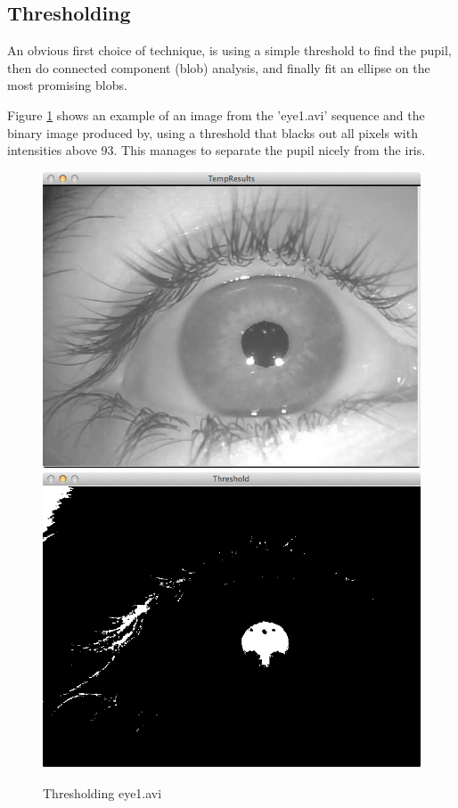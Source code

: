 \documentclass[a4paper,11pt]{article}
\begin{document}
\subsection{Thresholding}
An obvious first choice of technique, is using a simple threshold to find the pupil, then do connected component (blob) analysis, and finally fit an ellipse on the most promising blobs.

Figure \ref{fig:eye1_threshold_93} shows an example of an image from the 'eye1.avi' sequence and the binary image produced by, using a threshold that blacks out all pixels with intensities above 93. This manages to separate the pupil nicely from the iris.

\begin{figure}[H]
  \centering
  \includegraphics[scale=0.2]{eye1}
  \includegraphics[scale=0.2]{eye1_threshold_93}
  \caption{Thresholding eye1.avi}
  \label{fig:eye1_threshold_93}
\end{figure}
\end{document}
